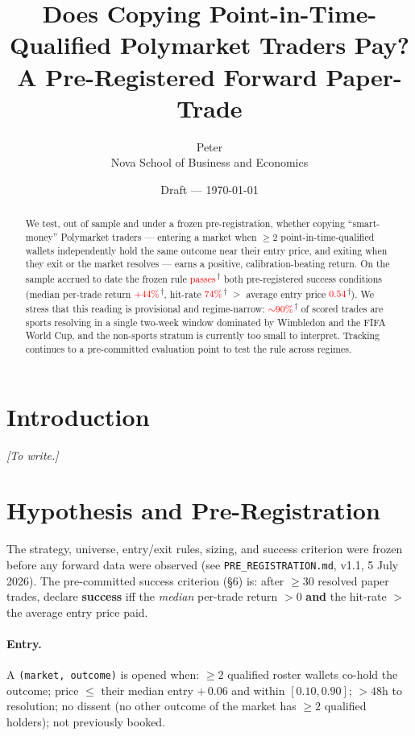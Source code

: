\documentclass[11pt]{article}
\title{Does Copying Point-in-Time-Qualified Polymarket Traders Pay?\\
\large A Pre-Registered Forward Paper-Trade}
\author{Peter \\ \small Nova School of Business and Economics}
\date{Draft --- \today}
\newcommand{\prov}[1]{\textcolor{red}{#1}\textsuperscript{\,$\dagger$}}
\begin{document}
\maketitle

\begin{abstract}
We test, out of sample and under a frozen pre-registration, whether copying
``smart-money'' Polymarket traders --- entering a market when $\geq 2$
point-in-time-qualified wallets independently hold the same outcome near their
entry price, and exiting when they exit or the market resolves --- earns a
positive, calibration-beating return. On the sample accrued to date the frozen
rule \prov{passes} both pre-registered success conditions (median per-trade
return \prov{$+44\%$}, hit-rate \prov{$74\%$} $>$ average entry price
\prov{$0.54$}). We stress that this reading is provisional and regime-narrow:
\prov{$\sim$90\%} of scored trades are sports resolving in a single two-week
window dominated by Wimbledon and the FIFA World Cup, and the non-sports stratum
is currently too small to interpret. Tracking continues to a pre-committed
evaluation point to test the rule across regimes.
\end{abstract}

\section{Introduction}
\emph{[To write.]}

\section{Hypothesis and Pre-Registration}
The strategy, universe, entry/exit rules, sizing, and success criterion were
frozen before any forward data were observed (see \texttt{PRE\_REGISTRATION.md},
v1.1, 5 July 2026). The pre-committed success criterion (\S6) is: after $\geq 30$
resolved paper trades, declare \textbf{success} iff the \emph{median} per-trade
return $>0$ \textbf{and} the hit-rate $>$ the average entry price paid.

\paragraph{Entry.} A \texttt{(market, outcome)} is opened when: $\geq 2$ qualified
roster wallets co-hold the outcome; price $\leq$ their median entry $+\,0.06$ and
within $[0.10, 0.90]$; $>48$h to resolution; no dissent (no other outcome of the
market has $\geq 2$ qualified holders); not previously booked.
\end{document}
